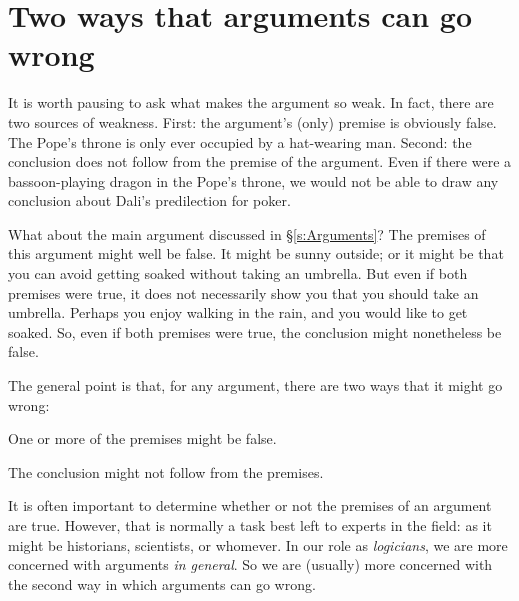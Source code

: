 \section{Two ways that arguments can go wrong}

It is worth pausing to ask what makes the argument so weak. In fact, there are two sources of weakness. First: the argument's (only) premise is obviously false. The Pope's throne is only ever occupied by a hat-wearing man. Second: the conclusion does not follow from the premise of the argument. Even if there were a bassoon-playing dragon in the Pope's throne, we would not be able to draw any conclusion about Dali's predilection for poker.

What about the main argument discussed in \S\ref{s:Arguments}? The premises of this argument might well be false. It might be sunny outside; or it might be that you can avoid getting soaked without taking an umbrella. But even if both premises were true, it does not necessarily show you that you should take an umbrella. Perhaps you enjoy walking in the rain, and you would like to get soaked. So, even if both premises were true, the conclusion might nonetheless be false.

%

The general point is that, for any argument, there are two ways that it might go wrong:
	\begin{ebullet}
		\item One or more of the premises might be false. 
		\item The conclusion might not follow from the premises.
	\end{ebullet}
It is often important to determine whether or not the premises of an argument are true. However, that is normally a task best left to experts in the field: as it might be historians, scientists, or whomever. In our role as \emph{logicians}, we are more concerned with arguments \emph{in general}. So we are (usually) more concerned with the second way in which arguments can go wrong.

